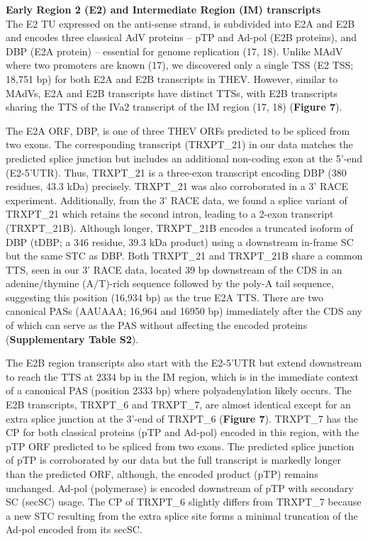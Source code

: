 \documentclass[
]{article}
\begin{document}
\textbf{Early Region 2 (E2) and Intermediate Region (IM) transcripts}\\
The E2 TU expressed on the anti-sense strand, is subdivided into E2A and
E2B and encodes three classical AdV proteins -- pTP and Ad-pol (E2B
proteins), and DBP (E2A protein) -- essential for genome replication
(17, 18). Unlike MAdV where two promoters are known (17), we discovered
only a single TSS (E2 TSS; 18,751 bp) for both E2A and E2B transcripts
in THEV. However, similar to MAdVs, E2A and E2B transcripts have
distinct TTSs, with E2B transcripts sharing the TTS of the IVa2
transcript of the IM region (17, 18) (\textbf{Figure 7}).

The E2A ORF, DBP, is one of three THEV ORFs predicted to be spliced from
two exons. The corresponding transcript (TRXPT\_21) in our data matches
the predicted splice junction but includes an additional non-coding exon
at the 5'-end (E2-5'UTR). Thus, TRXPT\_21 is a three-exon transcript
encoding DBP (380 residues, 43.3 kDa) precisely. TRXPT\_21 was also
corroborated in a 3' RACE experiment. Additionally, from the 3' RACE
data, we found a splice variant of TRXPT\_21 which retains the second
intron, leading to a 2-exon transcript (TRXPT\_21B). Although longer,
TRXPT\_21B encodes a truncated isoform of DBP (tDBP; a 346 residue, 39.3
kDa product) using a downstream in-frame SC but the same STC as DBP.
Both TRXPT\_21 and TRXPT\_21B share a common TTS, seen in our 3' RACE
data, located 39 bp downstream of the CDS in an adenine/thymine
(A/T)-rich sequence followed by the poly-A tail sequence, suggesting
this position (16,934 bp) as the true E2A TTS. There are two canonical
PASs (AAUAAA; 16,964 and 16950 bp) immediately after the CDS any of
which can serve as the PAS without affecting the encoded proteins
(\textbf{Supplementary Table S2}).

The E2B region transcripts also start with the E2-5'UTR but extend
downstream to reach the TTS at 2334 bp in the IM region, which is in the
immediate context of a canonical PAS (position 2333 bp) where
polyadenylation likely occurs. The E2B transcripts, TRXPT\_6 and
TRXPT\_7, are almost identical except for an extra splice junction at
the 3'-end of TRXPT\_6 (\textbf{Figure 7}). TRXPT\_7 has the CP for both
classical proteins (pTP and Ad-pol) encoded in this region, with the pTP
ORF predicted to be spliced from two exons. The predicted splice
junction of pTP is corroborated by our data but the full transcript is
markedly longer than the predicted ORF, although, the encoded product
(pTP) remains unchanged. Ad-pol (polymerase) is encoded downstream of
pTP with secondary SC (secSC) usage. The CP of TRXPT\_6 slightly differs
from TRXPT\_7 because a new STC resulting from the extra splice site
forms a minimal truncation of the Ad-pol encoded from its secSC.
\end{document}
